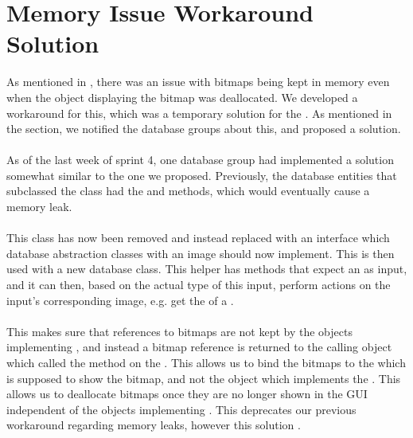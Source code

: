 
\section{Memory Issue Workaround Solution}
\label{sec:memory_issue_workaround_solution}

As mentioned in , there was an issue with bitmaps being kept in memory even when the object displaying the bitmap was deallocated. We developed a workaround for this, which was a temporary solution for the . As mentioned in the section, we notified the database groups about this, and proposed a solution.
\\\\
As of the last week of sprint 4, one database group had implemented a solution somewhat similar to the one we proposed. Previously, the database entities that subclassed the  class had the  and  methods, which would eventually cause a memory leak.
\\\\
This class has now been removed and instead replaced with an  interface which database abstraction classes with an image should now implement. This  is then used with a new  database class. This helper has methods that expect an  as input, and it can then, based on the actual type of this input, perform actions on the input's corresponding image, e.g. get the  of a .
\\\\
This makes sure that references to bitmaps are not kept by the objects implementing , and instead a bitmap reference is returned to the calling object which called the  method on the . This allows us to bind the bitmaps to the  which is supposed to show the bitmap, and not the object which implements the . This allows us to deallocate bitmaps once they are no longer shown in the GUI independent of the objects implementing . This deprecates our previous workaround regarding memory leaks, however this solution .